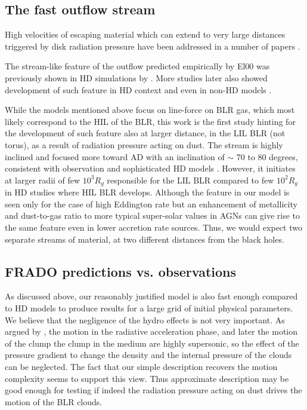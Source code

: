 \documentclass[twocolumn]{aastex62}
\begin{document}
\subsection{The fast outflow stream}

High velocities of escaping material which can extend to very large distances triggered by disk radiation pressure have been addressed in a number of papers \citep{Hopkins2010, Harrison2014, Ishibashi2015, Thompson2015, Ishibashi2017, Costa2020}.

The stream-like feature of the outflow predicted empirically by El00 was previously shown in HD simulations by \citet{proga1998, proga1999, proga2000}. More studies later also showed development of such feature in HD context \citep[see e.g.][]{proga2004, Sim2010, Nomura2020} and even in non-HD models \citep[][]{Risaliti2010, Nomura2013}.

While the models mentioned above focus on line-force on BLR gas, which most likely correspond to the HIL of the BLR, this work is the first study hinting for the development of such feature also at larger distance, in the LIL BLR (not torus), as a result of radiation pressure acting on dust. The stream is highly inclined and focused more toward AD with an inclination of $\sim$ 70 to 80 degrees, consistent with observation \citep{GravityColl2018} and sophisticated HD models \citep[e.g.][]{proga2000, proga2004, Nomura2020}. However, it initiates at larger radii of few $10^3 R_{g}$ responsible for the LIL BLR compared to few  $10^2 R_{g}$ in HD studies \citep[also see][]{Sim2010, higginbottom2014} where HIL BLR develops. Although the feature in our model is seen only for the case of high Eddington rate but an enhancement of metallicity and dust-to-gas ratio to more typical super-solar values in AGNs can give rise to the same feature even in lower accretion rate sources. Thus, we would expect two separate streams of material, at two different distances from the black holes.

\subsection{FRADO predictions vs. observations} \label{sec:observation}

As discussed above, our reasonably justified model is also fast enough compared to HD models to produce results for a large grid of initial physical parameters. We believe that the negligence of the hydro effects is not very important. As argued by \citet{Risaliti2010}, the motion in the radiative acceleration phase, and later the motion of the clump the clump in the medium are highly supersonic, so the effect of the pressure gradient to change the density and the internal pressure of the clouds can be neglected. The fact that our simple description recovers the motion complexity seems to support this view. Thus approximate description may be good enough for testing if indeed the radiation pressure acting on dust drives the motion of the BLR clouds.
\end{document}
